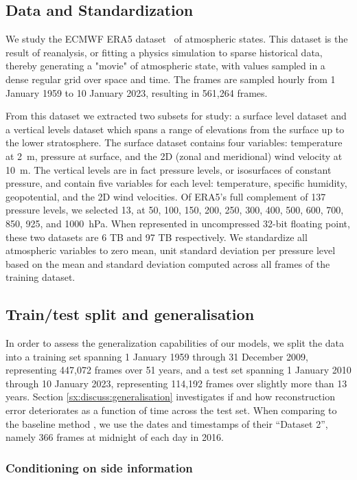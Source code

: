 \documentclass[11pt, a4paper, logo, copyright, numbering]{googledeepmind}
\begin{document}
\subsection{Data and Standardization}
We study the ECMWF ERA5 dataset~\citep{era5} of atmospheric states. This dataset is the result of reanalysis, or fitting a physics simulation to sparse historical data, thereby generating a "movie" of atmospheric state, with values sampled in a dense regular grid over space and time. The frames are sampled hourly from 1 January 1959 to 10 January 2023, resulting in 561,264 frames.

From this dataset we extracted two subsets for study: a surface level dataset and a vertical levels dataset which spans a range of elevations from the surface up to the lower stratosphere. The surface dataset contains four variables: temperature at 2~m, pressure at surface, and the 2D (zonal and meridional) wind velocity at 10~m. The vertical levels are in fact pressure levels, or isosurfaces of constant pressure, and contain five variables for each level: temperature, specific humidity, geopotential, and the 2D wind velocities. 
Of ERA5's full complement of 137 pressure levels, we selected 13, at 50, 100, 150, 200, 250, 300, 400, 500, 600, 700, 850, 925, and 1000~hPa. When represented in uncompressed 32-bit floating point, these two datasets are 6 TB and 97 TB respectively.
We standardize all atmospheric variables to zero mean, unit standard deviation per pressure level based on the mean and standard deviation computed across all frames of the training dataset.

\subsection{Train/test split and generalisation}

In order to assess the generalization capabilities of our models, we split the data into a training set spanning 1 January 1959 through 31 December 2009, representing 447,072 frames over 51 years, and a test set spanning 1 January 2010 through 10 January 2023, representing 114,192 frames over slightly more than 13 years. Section \ref{sx:discuss:generalisation} investigates if and how reconstruction error deteriorates as a function of time across the test set.
When comparing to the baseline method \citep{huang2022compressing}, we use the dates and timestamps of their ``Dataset 2'', namely 366 frames at midnight of each day in 2016.

\subsubsection{Conditioning on side information}
\end{document}
